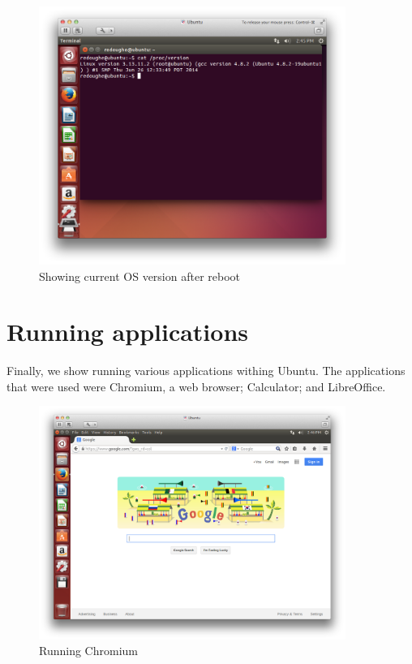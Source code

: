 \documentclass[12pt]{article}
\newcommand{\imagesize}{100mm}
\begin{document}
\begin{figure}
\centering
\includegraphics[width=\imagesize]{11.jpg}
\caption{Showing current OS version after reboot}
\end{figure}

\newpage

\section{Running applications}
Finally, we show running various applications withing Ubuntu. The applications that were used were Chromium, a web browser; Calculator; and LibreOffice.

\begin{figure}
\centering
\includegraphics[width=\imagesize]{12.jpg}
\caption{Running Chromium}
\end{figure}
\end{document}
